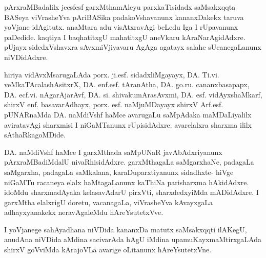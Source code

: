 \medskip

pArxraMBadalilx jeesfesf garxMthamAleyu parxkaTisidadx saMsakxqqta BASeya viVrasheYva pAriBASika padakoVshavanunx kananxDakekx taruva yoVjane idAgitutx. anaMtara adu visAtxravAgi beLedu Iga I rUpavanunx paDedide. kaqtiya I baqhatitxgU mahatitxgU aneVkaru kAraNarAgidAdxre. pUjayx sidedxVshavxra sAvxmiVjiyavaru AgAga agatayx salahe sUcanegaLanunx niVDidAdxre.

\medskip

hiriya vidAvxMsarugaLAda porx. ji.esf. sidadxliMgayayx, DA. Ti.vi. veMkaTAcalashAsitxrX,     DA. enf.esf. tAranAtha, DA. go.ru. cananxbasapapx, DA. ecf.vi. nAgarAjarAvf, DA. si. shivakumArasAvxmi, DA. esf. vidAyxshaMkarf, shirxV enf. basavarAdhayx, porx. esf. naMjuMDayayx shirxV Arf.esf. pUNARnaMda DA. naMdiVshf haMce avarugaLu saMpAdaka maMDaLiyalilx aviratavAgi sharxmisi I niGaMTanunx rUpisidAdxre. avarelalxra sharxma ililx sAthaRkagoMDide.

\medskip

DA. naMdiVshf haMce I garxMthada saMpUNaR javAbAdxriyanunx pArxraMBadiMdalU nivaRhisidAdxre. garxMthagaLa saMgarxhaNe, padagaLa saMgarxha, padagaLa saMkalana, karaDuparxtiyanunx sidadhxte- hiVge niGaMTu racaneya elalx haMtagaLanunx kaThiNa parisharxma hAkidAdxre. idoMdu sharxmadAyaka kelasavAdarU pirxVti, sharxdedxyiMda mADidAdxre. I garxMtha elalxrigU doretu, vacanagaLa, viVrasheYva kAvayxgaLa adhayxyanakekx neravAgaleMdu hAreYsutetxVve.

\medskip

I yoVjanege sahAyadhana niVDida kananxDa matutx saMsakxqqti ilAKegU, anudAna niVDida aMdina sacivarAda hAgU iMdina upamuKayxmaMtirxgaLAda shirxV goVviMda kArajoVLa avarige oLitanunx hAreYsutetxVne.
